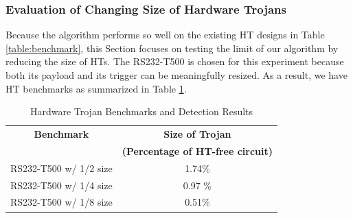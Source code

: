 \documentclass[journal]{IEEEtran}
\begin{document}
\subsubsection{Evaluation of Changing Size of Hardware Trojans}
Because the algorithm performs so well on the existing HT designs in Table \ref{table:benchmark}, this Section focuses on testing the limit of our algorithm by reducing the size of HTs. The RS232-T500 is chosen for this experiment because both its payload and its trigger can be meaningfully resized. As a result, we have HT benchmarks as summarized in Table \ref{table:size}.

\bgroup
\def\arraystretch{1.5}%
\begin{table}
	\centering
	\caption{Hardware Trojan Benchmarks and Detection Results}
	\begin{tabular}{|c|c|} 
		\hline
		\textbf{Benchmark} & \textbf{Size of Trojan} \\ 
		& \textbf{(Percentage of HT-free circuit)}  \\
		
		\hline
		RS232-T500 w/ 1/2 size  & 1.74\%  \\
		\hline
		RS232-T500 w/ 1/4 size & 0.97 \% \\
		\hline
		RS232-T500 w/ 1/8 size & 0.51\% \\
		
		\hline
	\end{tabular}
	\label{table:size}
\end{table}
\egroup







%
\end{document}
